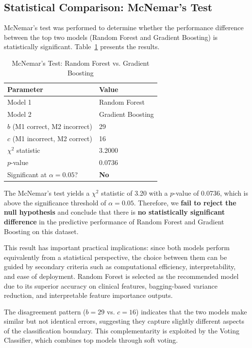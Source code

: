 \documentclass[conference,10pt]{IEEEtran}
\begin{document}
\subsection{Statistical Comparison: McNemar's Test}
\label{subsec:mcnemar_results}

McNemar's test was performed to determine whether the performance difference between the top two models (Random Forest and Gradient Boosting) is statistically significant. Table~\ref{tab:mcnemar} presents the results.

\begin{table}[!t]
\centering
\caption{McNemar's Test: Random Forest vs. Gradient Boosting}
\label{tab:mcnemar}
\begin{tabular}{ll}
\toprule
\textbf{Parameter} & \textbf{Value} \\
\midrule
Model 1 & Random Forest \\
Model 2 & Gradient Boosting \\
$b$ (M1 correct, M2 incorrect) & 29 \\
$c$ (M1 incorrect, M2 correct) & 16 \\
$\chi^2$ statistic & 3.2000 \\
$p$-value & 0.0736 \\
Significant at $\alpha = 0.05$? & \textbf{No} \\
\bottomrule
\end{tabular}
\end{table}

The McNemar's test yields a $\chi^2$ statistic of 3.20 with a $p$-value of 0.0736, which is above the significance threshold of $\alpha = 0.05$. Therefore, we \textbf{fail to reject the null hypothesis} and conclude that there is \textbf{no statistically significant difference} in the predictive performance of Random Forest and Gradient Boosting on this dataset.

This result has important practical implications: since both models perform equivalently from a statistical perspective, the choice between them can be guided by secondary criteria such as computational efficiency, interpretability, and ease of deployment. Random Forest is selected as the recommended model due to its superior accuracy on clinical features, bagging-based variance reduction, and interpretable feature importance outputs.

The disagreement pattern ($b = 29$ vs. $c = 16$) indicates that the two models make similar but not identical errors, suggesting they capture slightly different aspects of the classification boundary. This complementarity is exploited by the Voting Classifier, which combines top models through soft voting.
\end{document}
